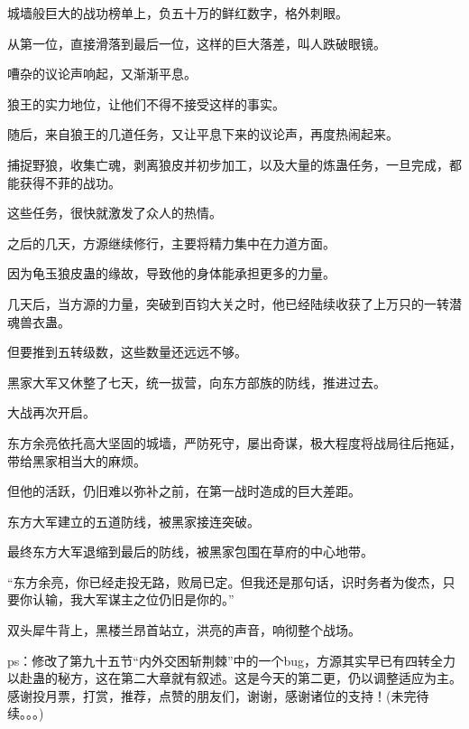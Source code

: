 \begin{this_body}
城墙般巨大的战功榜单上，负五十万的鲜红数字，格外刺眼。

从第一位，直接滑落到最后一位，这样的巨大落差，叫人跌破眼镜。

嘈杂的议论声响起，又渐渐平息。

狼王的实力地位，让他们不得不接受这样的事实。

随后，来自狼王的几道任务，又让平息下来的议论声，再度热闹起来。

捕捉野狼，收集亡魂，剥离狼皮并初步加工，以及大量的炼蛊任务，一旦完成，都能获得不菲的战功。

这些任务，很快就激发了众人的热情。

之后的几天，方源继续修行，主要将精力集中在力道方面。

因为龟玉狼皮蛊的缘故，导致他的身体能承担更多的力量。

几天后，当方源的力量，突破到百钧大关之时，他已经陆续收获了上万只的一转潜魂兽衣蛊。

但要推到五转级数，这些数量还远远不够。

黑家大军又休整了七天，统一拔营，向东方部族的防线，推进过去。

大战再次开启。

东方余亮依托高大坚固的城墙，严防死守，屡出奇谋，极大程度将战局往后拖延，带给黑家相当大的麻烦。

但他的活跃，仍旧难以弥补之前，在第一战时造成的巨大差距。

东方大军建立的五道防线，被黑家接连突破。

最终东方大军退缩到最后的防线，被黑家包围在草府的中心地带。

“东方余亮，你已经走投无路，败局已定。但我还是那句话，识时务者为俊杰，只要你认输，我大军谋主之位仍旧是你的。”

双头犀牛背上，黑楼兰昂首站立，洪亮的声音，响彻整个战场。

ps：修改了第九十五节“内外交困斩荆棘”中的一个bug，方源其实早已有四转全力以赴蛊的秘方，这在第二大章就有叙述。这是今天的第二更，仍以调整适应为主。感谢投月票，打赏，推荐，点赞的朋友们，谢谢，感谢诸位的支持！(未完待续。。。)

\end{this_body}

